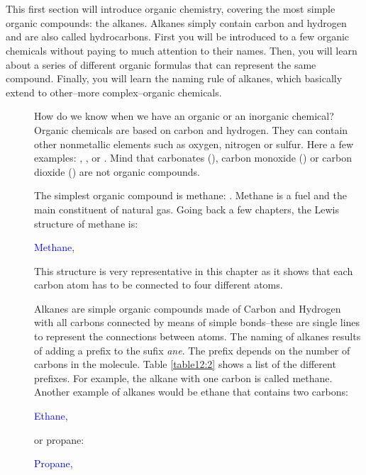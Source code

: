 \documentclass[main.tex]{subfiles}
\begin{document}
\section{\color{blue!30!black}{Alkanes}}
This first section will introduce organic chemistry, covering the most simple organic compounds: the alkanes. Alkanes simply contain carbon and hydrogen and are also called hydrocarbons. First you will be introduced to a few organic chemicals without paying to much attention to their names. Then, you will learn about a series of different organic formulas that can represent the same compound. Finally, you will learn the naming rule of alkanes, which basically extend to other--more complex--organic chemicals.
\sloppy
\begin{description}
\item[] How do we know when we have an organic or an inorganic chemical? Organic chemicals are based on carbon and hydrogen. They can contain other nonmetallic elements such as oxygen, nitrogen or sulfur. Here a few examples: , ,  or . Mind that carbonates (), carbon monoxide () or carbon dioxide () are not organic compounds. 

\item[] The simplest organic compound is methane: . Methane is a fuel and the main constituent of natural gas. Going back a few chapters, the Lewis structure of methane is:
\begin{center}\hspace{0.5cm}\textcolor{blue}{Methane, }\end{center}
This structure is very representative in this chapter as it shows that each carbon atom has to be connected to four different atoms.

\item[] Alkanes are simple organic compounds made of Carbon and Hydrogen with all carbons connected by means of simple bonds--these are single lines to represent the connections between atoms. The naming of alkanes results of adding a prefix to the sufix \emph{ane}. The prefix depends on the number of carbons in the molecule. Table \ref{table12:2} shows a list of the different prefixes. For example, the alkane with one carbon is called methane. Another example of alkanes would be ethane that contains two carbons:
\begin{center} \hspace{0.5cm}\textcolor{blue}{Ethane, }\end{center}
or propane:
\begin{center} \hspace{0.5cm}\textcolor{blue}{Propane, }\end{center}





\end{description}
\end{document}
